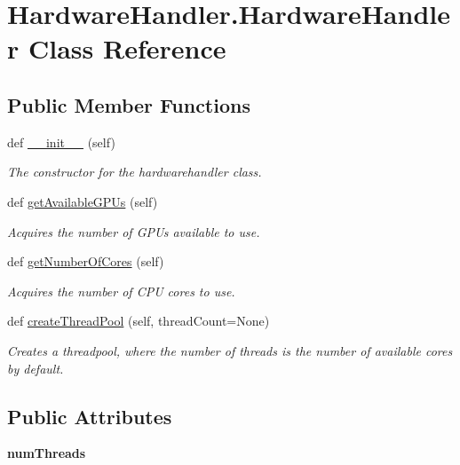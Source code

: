 \hypertarget{classHardwareHandler_1_1HardwareHandler}{}\section{Hardware\+Handler.\+Hardware\+Handler Class Reference}
\label{classHardwareHandler_1_1HardwareHandler}
\subsection*{Public Member Functions}
\begin{DoxyCompactItemize}
\item 
def \mbox{\hyperlink{classHardwareHandler_1_1HardwareHandler_a68c756eacee30649402e79aa0eb23984}{\+\_\+\+\_\+init\+\_\+\+\_\+}} (self)
\begin{DoxyCompactList}\small\item\em The constructor for the hardwarehandler class. \end{DoxyCompactList}\item 
def \mbox{\hyperlink{classHardwareHandler_1_1HardwareHandler_aeec8da28ba05b3d7d75cc287b12b71a6}{get\+Available\+G\+P\+Us}} (self)
\begin{DoxyCompactList}\small\item\em Acquires the number of G\+P\+Us available to use. \end{DoxyCompactList}\item 
def \mbox{\hyperlink{classHardwareHandler_1_1HardwareHandler_af9961ceb39d7c07ab58e52841a075a3c}{get\+Number\+Of\+Cores}} (self)
\begin{DoxyCompactList}\small\item\em Acquires the number of C\+PU cores to use. \end{DoxyCompactList}\item 
def \mbox{\hyperlink{classHardwareHandler_1_1HardwareHandler_ab3543fd1ac95a06e42f51b879ad803f2}{create\+Thread\+Pool}} (self, thread\+Count=None)
\begin{DoxyCompactList}\small\item\em Creates a threadpool, where the number of threads is the number of available cores by default. \end{DoxyCompactList}\end{DoxyCompactItemize}
\subsection*{Public Attributes}
\begin{DoxyCompactItemize}
\item 
\mbox{\label{classHardwareHandler_1_1HardwareHandler_a7f4d624de0e21d288fd68d6a3bd59448}} 
{\bfseries num\+Threads}
\end{DoxyCompactItemize}
